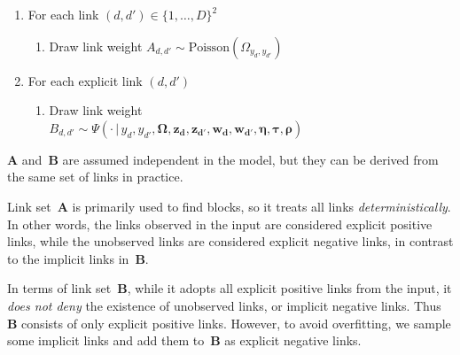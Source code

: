 \begin{small}
\begin{enumerate}[leftmargin=*,noitemsep]
\begin{enumerate}
    \end{enumerate}
\item For each link $(d,d') \in \{1,\ldots,D\}^2$
    \begin{enumerate}
    \item Draw link weight $A_{d,d'} \sim \mathrm{Poisson} (\Omega_{y_d,y_{d'}})$
    \end{enumerate}
\item For each explicit link $(d,d')$
    \begin{enumerate}
    \item Draw link weight\\
    $B_{d,d'}\sim \Psi(\cdot\,|\,y_d, y_{d'}, \bm{\Omega}, \bm{z_d}, \bm{z_{d'}}, \bm{w_d}, \bm{w_{d'}}, \bm{\eta}, \bm{\tau}, \bm{\rho})$
    \end{enumerate}
\end{enumerate}
\end{small}

$\bm{A}$ and~$\bm{B}$ are assumed independent in the model,
but they can be derived from the same set of links in practice.

Link set~$\bm{A}$ is primarily used to find blocks, so it treats all
links \emph{deterministically}.  In other words, the links observed in the
input are considered explicit positive links, while the unobserved
links are considered explicit negative links, in contrast to the
implicit links in~$\bm{B}$.

In terms of link set~$\bm{B}$, while it adopts all explicit positive
links from the input, it \emph{does not deny} the existence of unobserved
links, or implicit negative links. Thus~$\bm{B}$ consists of only
explicit positive links. However, to avoid overfitting, we
sample some implicit links and add them to~$\bm{B}$ as explicit
negative links.